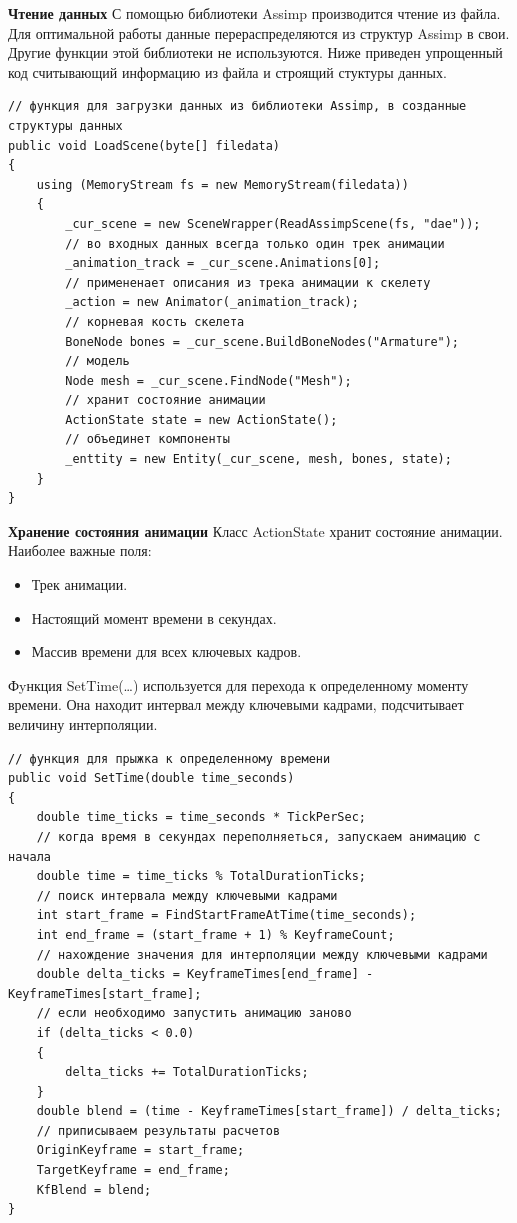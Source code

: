 \textbf{Чтение данных}
С помощью библиотеки Assimp производится чтение из файла. Для оптимальной работы данные перераспределяются из структур Assimp в свои. Другие функции этой библиотеки не используются.
Ниже приведен упрощенный код считывающий информацию из файла и строящий стуктуры данных.

\begin{verbatim}
// функция для загрузки данных из библиотеки Assimp, в созданные структуры данных
public void LoadScene(byte[] filedata)
{
    using (MemoryStream fs = new MemoryStream(filedata))
    {
        _cur_scene = new SceneWrapper(ReadAssimpScene(fs, "dae"));
        // во входных данных всегда только один трек анимации
        _animation_track = _cur_scene.Animations[0];
        // примененает описания из трека анимации к скелету
        _action = new Animator(_animation_track);
        // корневая кость скелета
        BoneNode bones = _cur_scene.BuildBoneNodes("Armature");
        // модель
        Node mesh = _cur_scene.FindNode("Mesh");
        // хранит состояние анимации
        ActionState state = new ActionState();
        // объединет компоненты
        _enttity = new Entity(_cur_scene, mesh, bones, state);
    }
}
\end{verbatim}


\textbf{Хранение состояния анимации}
Класс ActionState хранит состояние анимации. Наиболее важные поля:
\begin{itemize}
\item Трек анимации.
\item Настоящий момент времени в секундах.
\item Массив времени для всех ключевых кадров.
\end{itemize}

Фyнкция SetTime(\dots) используется для перехода к определенному моменту времени. Она находит интервал между ключевыми кадрами, подсчитывает величину интерполяции.

\begin{verbatim}
// функция для прыжка к определенному времени
public void SetTime(double time_seconds)
{            
    double time_ticks = time_seconds * TickPerSec;
    // когда время в секундах переполняеться, запускаем анимацию с начала
    double time = time_ticks % TotalDurationTicks;
    // поиск интервала между ключевыми кадрами
    int start_frame = FindStartFrameAtTime(time_seconds);
    int end_frame = (start_frame + 1) % KeyframeCount;
    // нахождение значения для интерполяции между ключевыми кадрами
    double delta_ticks = KeyframeTimes[end_frame] - KeyframeTimes[start_frame];
    // если необходимо запустить анимацию заново
    if (delta_ticks < 0.0)
    {
        delta_ticks += TotalDurationTicks;
    }
    double blend = (time - KeyframeTimes[start_frame]) / delta_ticks;
    // приписываем результаты расчетов
    OriginKeyframe = start_frame;
    TargetKeyframe = end_frame;
    KfBlend = blend;
}
\end{verbatim}


